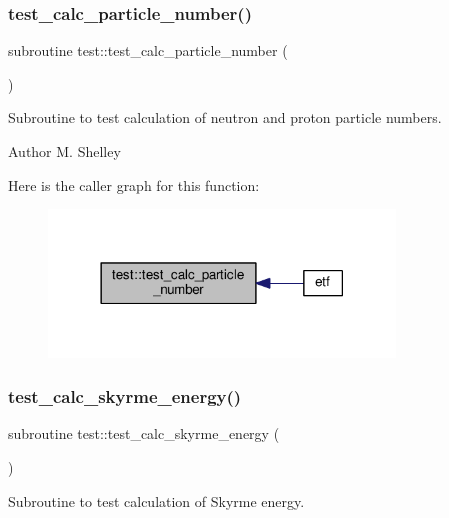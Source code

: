 \subsubsection{\texorpdfstring{test\+\_\+calc\+\_\+particle\+\_\+number()}{test\_calc\_particle\_number()}}
{\footnotesize\ttfamily subroutine test\+::test\+\_\+calc\+\_\+particle\+\_\+number (\begin{DoxyParamCaption}{ }\end{DoxyParamCaption})}



Subroutine to test calculation of neutron and proton particle numbers. 

\begin{DoxyAuthor}{Author}
M. Shelley 
\end{DoxyAuthor}
Here is the caller graph for this function\+:
\nopagebreak
\begin{figure}[H]
\begin{center}
\leavevmode
\includegraphics[width=261pt]{namespacetest_af860540d68e055817e3f618b7a04298a_icgraph}
\end{center}
\end{figure}
\mbox{\label{namespacetest_aa2a14f70fb7372abc970b6271f19417f}} 
\subsubsection{\texorpdfstring{test\+\_\+calc\+\_\+skyrme\+\_\+energy()}{test\_calc\_skyrme\_energy()}}
{\footnotesize\ttfamily subroutine test\+::test\+\_\+calc\+\_\+skyrme\+\_\+energy (\begin{DoxyParamCaption}{ }\end{DoxyParamCaption})}



Subroutine to test calculation of Skyrme energy. 

